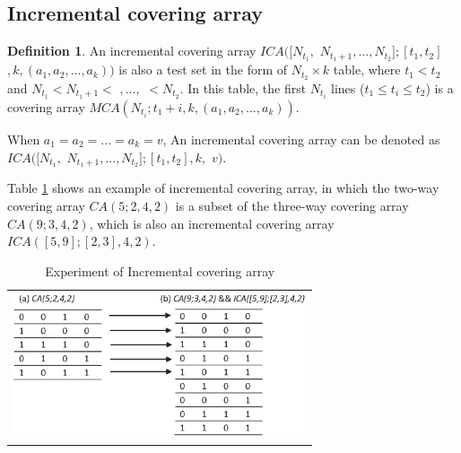 \documentclass[conference]{IEEEtran}
\theoremstyle{definition}
\newtheorem{definition}{Definition}
\begin{document}
\subsection{Incremental covering array}

\begin{definition}
An incremental covering array $ICA([N_{t_{1}},$ $N_{t_{1} + 1},...,N_{t_{2}}];[t_{1},t_{2}]$ $, k, (a_{1},a_{2},...,a_{k}))$ is also a test set in the form of $N_{t_{2}} \times k$ table, where $t_{1} < t_{2}$ and  $N_{t_{1}}<N_{t_{1} + 1} <$ $,...,$ $< N_{t_{2}}$.  In this table, the first $N_{t_{i}}$ lines ($t_{1}\leq t_{i} \leq t_{2}$) is a covering array $MCA(N_{t_{i}}; t_{1} + i, k , (a_{1},a_{2},...,a_{k}))$.

 When $ a_{1} = a_{2} = ... = a_{k} = v $, An incremental covering array can be denoted as $ICA([N_{t_{1}},$ $N_{t_{1} + 1},...,N_{t_{2}}];[t_{1},t_{2}], k,$ $ v)$.
\end{definition}


Table \ref{ica_example} shows an example of incremental covering array, in which the two-way covering array $CA(5;2,4,2)$ is a subset of the three-way covering array $CA(9;3,4,2)$, which is also an incremental covering array $ICA([5,9];[2,3],4,2)$.

\begin{table}[htbp]
  \small
  \centering
  \caption{Experiment of Incremental covering array}
  \label{ica_example}

    \begin{tabular}{c}
 \includegraphics[width=3.4in]{incremental_covering_ex.eps}
    \end{tabular}%

\end{table}
\end{document}
